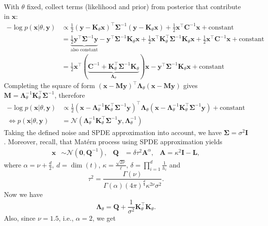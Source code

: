 \documentclass[times, a4paper, 12pt, onecolumn, oneside]{article}
\newcommand{\bm}{\boldsymbol}
\begin{document}
With $\theta$ fixed, collect terms (likelihood and prior) from posterior that contribute in $\bm{x}$:
$$
\begin{aligned}
-\log p(\bm{x} | \theta, \bm{y}) &\propto \frac{1}{2}(\bm{y} - \bm{K}_\theta \bm{x})^\intercal \bm{\Sigma}^{-1}(\bm{y} - \bm{K}_\theta \bm{x}) + \frac{1}{2} \bm{x}^\intercal \bm{C}^{-1} \bm{x} + \text{constant} \\
&= \underbrace{\frac{1}{2}\bm{y}^\intercal \bm{\Sigma}^{-1} \bm{y}}_{\text{also constant}} - \bm{y}^\intercal \bm{\Sigma}^{-1} \bm{K}_\theta \bm{x} + \frac{1}{2} \bm{x}^\intercal \bm{K}_\theta^\intercal \bm{\Sigma}^{-1} \bm{K}_\theta \bm{x} + \frac{1}{2}\bm{x}^\intercal \bm{C}^{-1} \bm{x} + \text{constant} \\
&= \frac{1}{2} \bm{x}^\intercal(\underbrace{\bm{C}^{-1} + \bm{K}_\theta^\intercal \bm{\Sigma}^{-1} \bm{K}_\theta}_{\bm{\Lambda}_\theta}) \bm{x} - \bm{y}^\intercal \bm{\Sigma}^{-1}\bm{K}_\theta \bm{x} + \text{constant}
\end{aligned}
$$
Completing the square of form $(\bm{x}-\bm{M}\bm{y})^\intercal\bm{\Lambda}_\theta(\bm{x} - \bm{M}\bm{y})$ gives $\bm{M} = \bm{\Lambda}_\theta^{-1} \bm{K}_\theta^\intercal \bm{\Sigma}^{-1}$, therefore
$$
\begin{aligned}
-\log p(\bm{x} | \theta, \bm{y}) &\propto \frac{1}{2}(\bm{x} - \bm{\Lambda}_\theta^{-1} \bm{K}_\theta^\intercal \bm{\Sigma}^{-1}\bm{y})^\intercal\bm{\Lambda}_\theta(\bm{x} - \bm{\Lambda}_\theta^{-1} \bm{K}_\theta^\intercal \bm{\Sigma}^{-1}\bm{y}) + \text{constant} \\
\Leftrightarrow p(\bm{x} | \theta, \bm{y}) &= \mathcal{N}(\bm{\Lambda}_\theta^{-1} \bm{K}_\theta^\intercal \bm{\Sigma}^{-1}\bm{y}, \bm{\Lambda}_\theta^{-1})
\end{aligned}
$$
Taking the defined noise and SPDE approximation into account, we have $\bm{\Sigma} = \sigma^2 \bm{I}$. Moreover, recall, that Matérn process using SPDE approximation yields
$$
\begin{aligned}
\bm{x} &\sim \mathcal{N}(\bm{0}, \bm{Q}^{-1}), & \bm{Q} &= \delta\tau^2 \bm{A}^\alpha, & \bm{A} = \kappa^2 \bm{I} - \bm{L},
\end{aligned}
$$
where $\alpha = \nu + \frac{d}{2}, ~ d = \dim(t)$, $\kappa = \frac{\sqrt{2\nu}}{\ell}$, $\delta = \prod_{i=1}^d \frac{1}{h_i}$ and
$$
\tau^2 = \frac{\Gamma(\nu)}{\Gamma(\alpha)(4\pi)^\frac{d}{4}\kappa^{2\nu}\sigma^2}.
$$
Now we have
$$
\bm{\Lambda}_\theta = \bm{Q} + \frac{1}{\sigma^2}\bm{K}_\theta^\intercal \bm{K}_\theta.
$$
Also, since $\nu=1.5$, i.e., $\alpha=2$, we get
\end{document}
